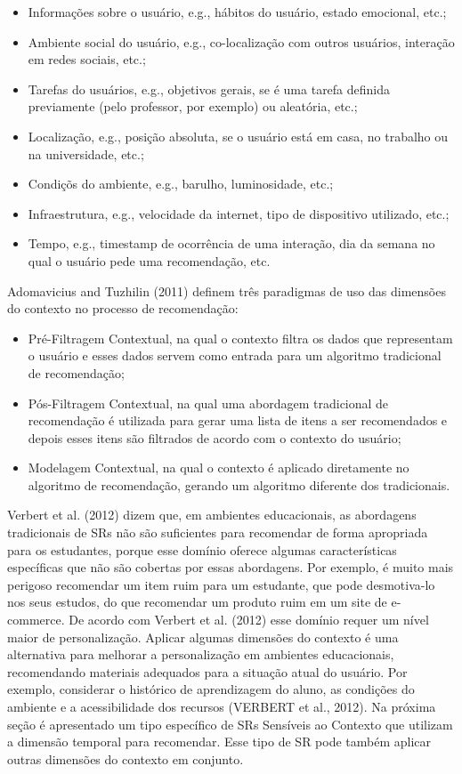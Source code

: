 \begin{itemize}
\item Informações sobre o usuário, e.g., hábitos do usuário, estado emocional, etc.;
\item Ambiente social do usuário, e.g., co-localização com outros usuários, interação em redes sociais, etc.;
\item Tarefas do usuários, e.g., objetivos gerais, se é uma tarefa definida previamente (pelo professor, por exemplo) ou aleatória, etc.;
\item Localização, e.g., posição absoluta, se o usuário está em casa, no trabalho ou na universidade, etc.;
\item Condiçõs do ambiente, e.g., barulho, luminosidade, etc.;
\item Infraestrutura, e.g., velocidade da internet, tipo de dispositivo utilizado, etc.;
\item Tempo, e.g., timestamp de ocorrência de uma interação, dia da semana no qual o usuário pede uma recomendação, etc.
\end{itemize}

Adomavicius and Tuzhilin (2011) definem três paradigmas de uso das dimensões do contexto no processo de recomendação:

\begin{itemize}
\item Pré-Filtragem Contextual, na qual o contexto filtra os dados que representam o usuário e esses dados servem como entrada para um algoritmo tradicional de recomendação;
\item Pós-Filtragem Contextual, na qual uma abordagem tradicional de recomendação é utilizada para gerar uma lista de itens a ser recomendados e depois esses itens são filtrados de acordo com o contexto do usuário;
\item Modelagem Contextual, na qual o contexto é aplicado diretamente no algoritmo de recomendação, gerando um algoritmo diferente dos tradicionais.
\end{itemize}

Verbert et al. (2012) dizem que, em ambientes educacionais, as abordagens tradicionais de SRs não são suficientes para recomendar de forma apropriada para os estudantes, porque esse domínio oferece algumas características específicas que não são cobertas por essas abordagens. Por exemplo, é muito mais perigoso recomendar um item ruim para um estudante, que pode desmotiva-lo nos seus estudos, do que recomendar um produto ruim em um site de e-commerce. De acordo com Verbert et al. (2012) esse domínio requer um nível maior de personalização.
Aplicar algumas dimensões do contexto é uma alternativa para melhorar a personalização em ambientes educacionais, recomendando materiais adequados para a situação atual do usuário. Por exemplo, considerar o histórico de aprendizagem do aluno, as condições do ambiente e a acessibilidade dos recursos (VERBERT et al., 2012).
Na próxima seção é apresentado um tipo específico de SRs Sensíveis ao Contexto que utilizam a dimensão temporal para recomendar. Esse tipo de SR pode também aplicar outras dimensões do contexto em conjunto.

